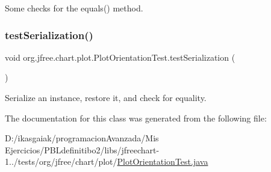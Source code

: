 Some checks for the equals() method. \mbox{\label{classorg_1_1jfree_1_1chart_1_1plot_1_1_plot_orientation_test_ac5e6bfaa72e66fa9de0b37daa1a14bae}} 
\subsubsection{\texorpdfstring{test\+Serialization()}{testSerialization()}}
{\footnotesize\ttfamily void org.\+jfree.\+chart.\+plot.\+Plot\+Orientation\+Test.\+test\+Serialization (\begin{DoxyParamCaption}{ }\end{DoxyParamCaption})}

Serialize an instance, restore it, and check for equality. 

The documentation for this class was generated from the following file\+:\begin{DoxyCompactItemize}
\item 
D\+:/ikasgaiak/programacion\+Avanzada/\+Mis Ejercicios/\+P\+B\+Ldefinitibo2/libs/jfreechart-\/1../tests/org/jfree/chart/plot/\mbox{\hyperlink{_plot_orientation_test_8java}{Plot\+Orientation\+Test.\+java}}\end{DoxyCompactItemize}
